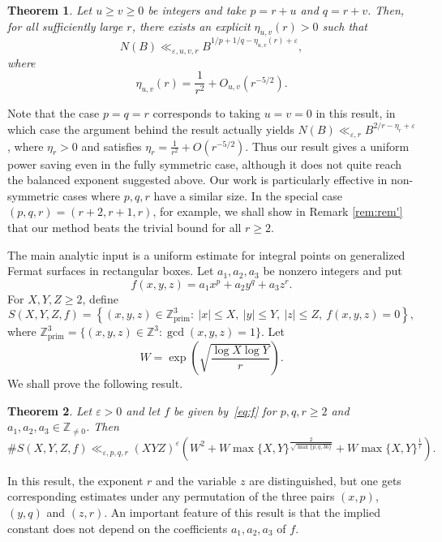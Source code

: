 \documentclass[a4paper,11pt,twoside,reqno]{amsart}
\newtheorem{theorem}{Theorem}[section]
\theoremstyle{definition}
\theoremstyle{remark}
\numberwithin{equation}{section}
\newcommand\eps{\varepsilon}
\newcommand\ve{\varepsilon}
\newcommand\ZZ{\mathbb{Z}}
\newcommand\ZZp{\mathbb{Z}_{\text{prim}}}
\newcommand\1{\mathbf{1}}
\renewcommand{\leq}{\leqslant}
\renewcommand{\geq}{\geqslant}
\begin{document}
\begin{theorem}\label{t:uv-main}
Let $u\geq v\geq0$ be integers and take 
$p=r+u$ and $q=r+v$.
Then, for all sufficiently large $r$, there exists an explicit
$\eta_{u,v}(r)>0$ such that
\[
N(B)
 \ll_{\varepsilon,u,v,r}
 B^{1/p+1/q-\eta_{u,v}(r)+\varepsilon},
\]
where
\[
\eta_{u,v}(r)
 =
 \frac1{r^2}+O_{u,v}(r^{-5/2}).
\]
\end{theorem}

Note that the case $p=q=r$ corresponds to taking $u=v=0$ in this result, in which case the argument behind the result actually yields $N(B) \ll_{\varepsilon,r} B^{2/r-\eta_r+\ve}$, where $\eta_r>0$ and satisfies
$\eta_r=\frac1{r^2}+O(r^{-5/2}) $. Thus our result gives a uniform power saving even in the fully symmetric case, 
although it does not quite reach the balanced exponent suggested above.
Our work is particularly effective in non-symmetric cases where
$p,q,r$ have a similar size. In the special case 
$(p,q,r)=(r+2,r+1,r)$, for example, we shall show in  Remark \ref{rem:rem'} that our method beats the trivial bound for all $r\geq 2$. 



\medskip

The main analytic input is a uniform estimate for integral points on
generalized Fermat surfaces in rectangular boxes. Let
$a_1,a_2,a_3$ be nonzero integers and put
\begin{equation}\label{eq:f}
f(x,y,z)=a_1x^p+a_2y^q+a_3z^r.
\end{equation}
For $X,Y,Z\geq2$, define
\begin{equation}\label{eq:hen}
S(X,Y,Z,f)
 =
 \left\{
 (x,y,z)\in\ZZp^3:
~|x|\leq X,~ |y|\leq Y,~ |z|\leq Z,~
 f(x,y,z)=0
 \right\},
\end{equation}
where $\ZZp^3=\{(x,y,z)\in \ZZ^3: \gcd(x,y,z)=1\} $.
Let 
\begin{equation}\label{eq:W}
	W=\exp\left(\sqrt{\frac{\log X \log Y}{r}}\right).
\end{equation}
We shall prove the following result. 

\begin{theorem}\label{thm:main2}
	Let $\eps>0$ and let 
	 $f$ be given by~\eqref{eq:f} for 
	 $p,q,r\geq 2$
	 and $a_1,a_2,a_3\in \ZZ_{\neq 0}$.
	 Then 
\[
		\#S(X,Y,Z,f)\ll_{\ve,p,q,r} (XYZ)^{\ve}\left(W^2+W\max\{X,Y\}^{\frac{2}{\sqrt{\max\{p,q,36\}}}}+W\max\{X,Y\}^{\frac{1}{r}}\right).
\]
\end{theorem}

In this result, the exponent $r$ and the variable $z$ are distinguished, but one gets corresponding estimates 
under any permutation of the three pairs $(x,p)$, $(y,q)$ and $(z,r)$.
An important feature of this result is that the implied constant does not depend on the coefficients $a_1,a_2,a_3$ of $f$. 
\end{document}
